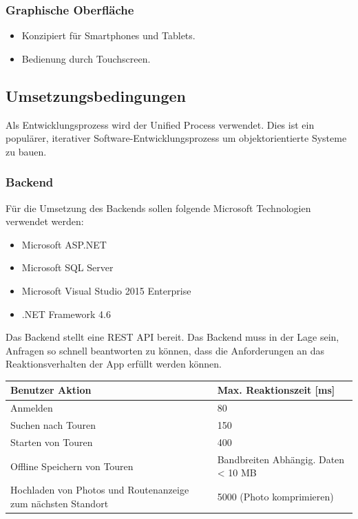 \documentclass[a4paper,10pt,xetex]{article}
\begin{document}
\subsubsection{Graphische Oberfläche}\label{graphische-oberfluxe4che}
\begin{itemize}
  \item Konzipiert für Smartphones und Tablets.
  \item Bedienung durch Touchscreen.
\end{itemize}


\subsection{Umsetzungsbedingungen}\label{umsetzungsbedingungen}
Als Entwicklungsprozess wird der Unified Process verwendet. Dies ist ein
populärer, iterativer Software-Entwicklungsprozess um objektorientierte
Systeme zu bauen.\cite{UP}


\subsubsection{Backend}\label{backend}
Für die Umsetzung des Backends sollen folgende Microsoft Technologien
verwendet werden:

\begin{itemize}
  \item Microsoft ASP.NET
  \item Microsoft SQL Server
  \item Microsoft Visual Studio 2015 Enterprise
  \item .NET Framework 4.6
\end{itemize}

Das Backend stellt eine REST API bereit. Das Backend muss in der Lage
sein, Anfragen so schnell beantworten zu können, dass die Anforderungen
an das Reaktionsverhalten der App erfüllt werden können.

\begin{longtabu} to \textwidth { | X[l] | l | }
\hline
\textbf{Benutzer Aktion} & \textbf{Max. Reaktionszeit {[}ms{]}}\\\hline
\endhead

Anmelden & 80\\\hline
Suchen nach Touren & 150\\\hline
Starten von Touren & 400\\\hline
Offline Speichern von Touren & Bandbreiten Abhängig. Daten \textless{} 10 MB\\\hline
Hochladen von Photos und Routenanzeige zum nächsten Standort & 5000 (Photo komprimieren)\\\hline
\end{longtabu}
\end{document}
